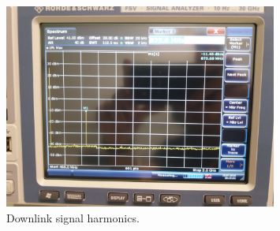 \begin{figure}[H]
    \begin{center}
        \includegraphics[width=0.8\textwidth]{figures/tests/downlink_harmonics.jpg}
        \caption{Downlink signal harmonics.}
        \label{fig:downlink-harmonics}
    \end{center}
\end{figure}
